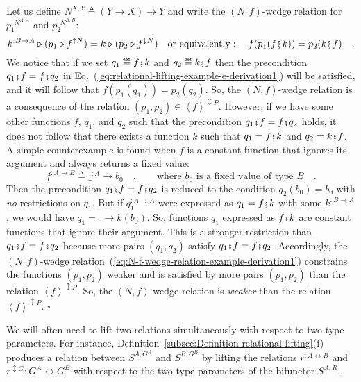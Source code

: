 Let us define $N^{X,Y}\triangleq\left(Y\rightarrow X\right)\rightarrow Y$
and write the $\left(N,f\right)$-wedge relation for $p_{1}^{:N^{A,A}}$
and $p_{2}^{:N^{B,B}}$:
\begin{equation}
k^{:B\rightarrow A}\triangleright(p_{1}\triangleright f^{\uparrow N})=k\triangleright(p_{2}\triangleright f^{\downarrow N})\quad\text{or equivalently}:\quad f(p_{1}(f\bef k))=p_{2}(k\bef f)\quad.\label{eq:N-f-wedge-relation-example-derivation1}
\end{equation}
We notice that if we set $q_{1}\triangleq f\bef k$ and $q_{2}\triangleq k\bef f$
then the precondition $q_{1}\bef f=f\bef q_{2}$ in Eq.~(\ref{eq:relational-lifting-example-e-derivation1})
will be satisfied, and it will follow that $f(p_{1}(q_{1}))=p_{2}(q_{2})$.
So, the $\left(N,f\right)$-wedge relation is a consequence of the
relation $(p_{1},p_{2})\in\left<f\right>^{\updownarrow P}$. However,
if we have some other functions $f$, $q_{1}$, and $q_{2}$ such
that the precondition $q_{1}\bef f=f\bef q_{2}$ holds, it does not
follow that there exists a function $k$ such that $q_{1}=f\bef k$
and $q_{2}=k\bef f$. A simple counterexample is found when $f$ is
a constant function that ignores its argument and always returns a
fixed value:
\[
f^{:A\rightarrow B}\triangleq\_^{:A}\rightarrow b_{0}\quad,\quad\quad\text{where }b_{0}\text{ is a fixed value of type }B\quad.
\]
Then the precondition $q_{1}\bef f=f\bef q_{2}$ is reduced to the
condition $q_{2}(b_{0})=b_{0}$ with \emph{no} restrictions on $q_{1}$.
But if $q_{1}^{:A\rightarrow A}$ were expressed as $q_{1}=f\bef k$
with some $k^{:B\rightarrow A}$, we would have $q_{1}=\_\rightarrow k(b_{0})$.
So, functions $q_{1}$ expressed as $f\bef k$ are constant functions
that ignore their argument. This is a stronger restriction than $q_{1}\bef f=f\bef q_{2}$
because more pairs $\left(q_{1},q_{2}\right)$ satisfy $q_{1}\bef f=f\bef q_{2}$.
Accordingly, the $\left(N,f\right)$-wedge relation~(\ref{eq:N-f-wedge-relation-example-derivation1})
constrains the functions $\left(p_{1},p_{2}\right)$ weaker and is
satisfied by more pairs $\left(p_{1},p_{2}\right)$ than the relation
$\left<f\right>^{\updownarrow P}$. So, the $\left(N,f\right)$-wedge
relation is\emph{ weaker} than the relation $\left<f\right>^{\updownarrow P}$.
$\square$

We will often need to lift two relations simultaneously with respect
to two type parameters. For instance, Definition~\ref{subsec:Definition-relational-lifting}(f)
produces a relation between $S^{A,G^{A}}$ and $S^{B,G^{B}}$ by lifting
the relations $r^{:A\leftrightarrow B}$ and $r^{\updownarrow G}:G^{A}\leftrightarrow G^{B}$
with respect to the two type parameters of the bifunctor $S^{A,R}$.

